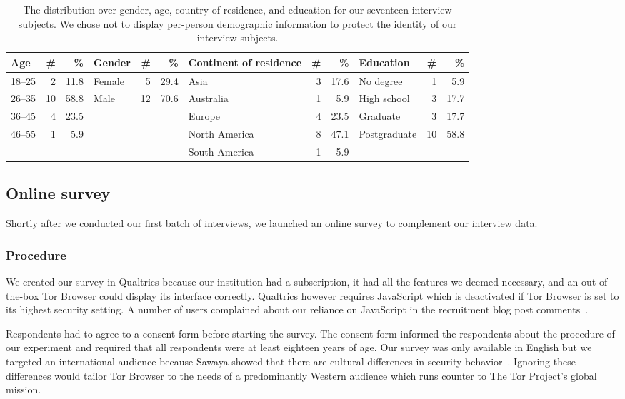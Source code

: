 \begin{table*}[ht]
	\centering
	\caption{The distribution over gender, age, country of residence, and
	education for our seventeen interview subjects.  We chose not to display
	per-person demographic information to protect the identity of our interview
	subjects.}
	\label{tab:interviewees}
	\begin{tabular}{l r r | l r r | l r r | l r r}
	\toprule
	Age & \# & \% &
	Gender & \# & \% &
	Continent of residence & \# & \% &
	Education & \# & \% \\
	\midrule
	18--25 & 2  & 11.8 & Female & 5  & 29.4 & Asia          & 3 & 17.6 & No degree    & 1  & 5.9 \\
	26--35 & 10 & 58.8 & Male   & 12 & 70.6 & Australia     & 1 &  5.9 & High school  & 3  & 17.7 \\
	36--45 & 4  & 23.5 &        &    &      & Europe        & 4 & 23.5 & Graduate     & 3  & 17.7 \\
	46--55 & 1  & 5.9  &        &    &      & North America & 8 & 47.1 & Postgraduate & 10 & 58.8 \\
	       &    &      &        &    &      & South America & 1 &  5.9 & & & \\
	\bottomrule
	\end{tabular}
\end{table*}

\subsection{Online survey}
\label{sec:online-survey}

Shortly after we conducted our first batch of interviews, we launched an online
survey to complement our interview data.

\subsubsection{Procedure}

We created our survey in Qualtrics because our institution had a subscription,
it had all the features we deemed necessary, and an out-of-the-box Tor Browser
could display its interface correctly.  Qualtrics however requires JavaScript
which is deactivated if Tor Browser is set to its highest security setting.  A
number of users complained about our reliance on JavaScript in the recruitment
blog post comments~\cite{Winter2017a}.

Respondents had to agree to a consent form before starting the survey. The
consent form informed the respondents about the procedure of our experiment and
required that all respondents were at least eighteen years of age.  Our survey
was only available in English but we targeted an international audience because
Sawaya \ea showed that there are cultural differences in security
behavior~\cite{Sawaya2017a}.  Ignoring these differences would tailor Tor
Browser to the needs of a predominantly Western audience which runs counter to
The Tor Project's global mission.

